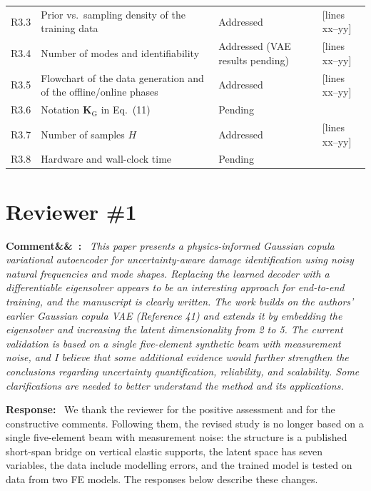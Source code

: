 \documentclass[11pt]{article}
\newenvironment{rcomment}[1]{\par\bigskip\noindent\textbf{Comment\ifx&#1&\else\ #1\fi:}\ \itshape}{\par}
\newenvironment{response}{\par\smallskip\noindent\color{resp}\textbf{Response:}\ }{\par}
\newcommand{\tbd}[1]{\textcolor{note}{\textsf{[#1]}}}
\newcommand{\lines}[1]{\tbd{lines #1}}
\begin{document}
{\begin{longtable}{p{1.55cm}p{6.0cm}p{3.0cm}p{3.6cm}}
R3.3 & Prior vs.\ sampling density of the training data & Addressed & \lines{xx--yy} \\
R3.4 & Number of modes and identifiability & Addressed (VAE results pending) & \lines{xx--yy} \\
R3.5 & Flowchart of the data generation and of the offline/online phases & Addressed & \lines{xx--yy} \\
R3.6 & Notation $\mathbf{K}_{\mathrm{G}}$ in Eq.~(11) & Pending & \\
R3.7 & Number of samples $H$ & Addressed & \lines{xx--yy} \\
R3.8 & Hardware and wall-clock time & Pending & \\
\bottomrule
\end{longtable}
}

\section{Reviewer \#1}

\begin{rcomment}{}
This paper presents a physics-informed Gaussian copula variational autoencoder for uncertainty-aware damage
identification using noisy natural frequencies and mode shapes. Replacing the learned decoder with a differentiable
eigensolver appears to be an interesting approach for end-to-end training, and the manuscript is clearly written. The work
builds on the authors' earlier Gaussian copula VAE (Reference 41) and extends it by embedding the eigensolver and
increasing the latent dimensionality from 2 to 5. The current validation is based on a single five-element synthetic
beam with measurement noise, and I believe that some additional evidence would further strengthen the conclusions
regarding uncertainty quantification, reliability, and scalability. Some clarifications are needed to better understand
the method and its applications.
\end{rcomment}

\begin{response}
We thank the reviewer for the positive assessment and for the constructive comments. Following them, the revised
study is no longer based on a single five-element beam with measurement noise: the structure is a published short-span bridge on
vertical elastic supports, the latent space has seven variables, the data include modelling
errors, and the trained model is tested on data from two FE models. The responses below describe these changes.
\end{response}
\end{document}
